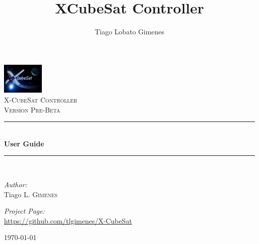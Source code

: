 \documentclass[pdftex,11pt,a4paper,titlepage]{report}
\author{Tiago Lobato Gimenes}
\title{XCubeSat Controller}
\newcommand{\HRule}{\rule{\linewidth}{0.5mm}}
\begin{document}
\begin{titlepage}
\begin{center}

\includegraphics[width=0.15\textwidth]{../images/CubeSat3.jpg}~\\[1cm]

\textsc{\LARGE X-CubeSat Controller}\\[1.5cm]

\textsc{\Large Version Pre-Beta}\\[0.5cm]

\HRule \\[0.4cm]
{ \huge \bfseries User Guide \\[0.4cm] }

\HRule \\[1.5cm]

\begin{minipage}{0.4\textwidth}
\begin{flushleft} \large
\emph{Author:}\\
Tiago \textsc{L. Gimenes}
\end{flushleft}
\end{minipage}
\begin{minipage}{0.4\textwidth}
\begin{flushright} \large
\emph{Project Page:} \\
\url{https://github.com/tlgimenes/X-CubeSat}
\end{flushright}
\end{minipage}

\vfill

{\large \today}

\end{center}
\end{titlepage}

\tableofcontents
\newpage

\end{document}
